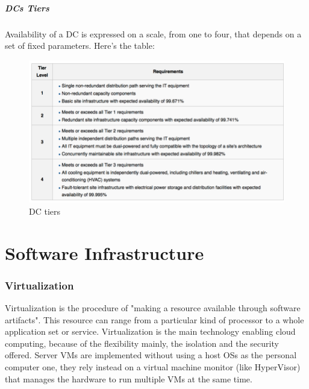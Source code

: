 \documentclass[10pt,a4paper]{article}
\begin{document}
				\subsubsection{DCs Tiers}
					Availability of a DC is expressed on a scale, from one to four, that depends on a set of fixed parameters. Here's the table:
					\begin{figure}[H]
						\centering
						\includegraphics[width = \textwidth]{./images/tiers.png}
						\caption{DC tiers}
					\end{figure}

	\clearpage \part{Software Infrastructure}
		\section{Virtualization}
			Virtualization is the procedure of "making a resource available through software artifacts". This resource can range from a particular kind of processor to a whole application set or service. Virtualization is the main technology enabling cloud computing, because of the flexibility mainly, the isolation and the security offered. Server VMs are implemented without using a host OSs as the personal computer one, they rely instead on a virtual machine monitor (like HyperVisor) that manages the hardware to run multiple VMs at the same time.
			
\end{document}
